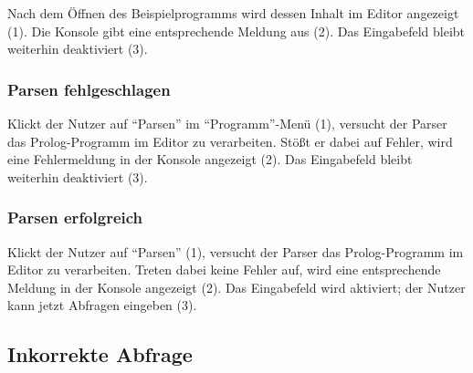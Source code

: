 \documentclass[parskip=full,11pt,twoside]{scrartcl}
\begin{document}
Nach dem Öffnen des Beispielprogramms wird dessen Inhalt im Editor angezeigt (1).
Die Konsole gibt eine entsprechende Meldung aus (2).
Das Eingabefeld bleibt weiterhin deaktiviert (3).

\subsubsection{Parsen fehlgeschlagen}

\begin{minipage}{\linewidth}
\end{minipage}

Klickt der Nutzer auf \enquote{Parsen} im \enquote{Programm}-Menü (1), versucht der Parser das Prolog-Programm im Editor zu verarbeiten.
Stößt er dabei auf Fehler, wird eine Fehlermeldung in der Konsole angezeigt (2).
Das Eingabefeld bleibt weiterhin deaktiviert (3).

\subsubsection{Parsen erfolgreich}

\begin{minipage}{\linewidth}
\end{minipage}

Klickt der Nutzer auf \enquote{Parsen} (1), versucht der Parser das Prolog-Programm im Editor zu verarbeiten.
Treten dabei keine Fehler auf, wird eine entsprechende Meldung in der Konsole angezeigt (2).
Das Eingabefeld wird aktiviert; der Nutzer kann jetzt Abfragen eingeben (3).

\subsection{Inkorrekte Abfrage}

\begin{minipage}{\linewidth}
\end{minipage}
\end{document}
